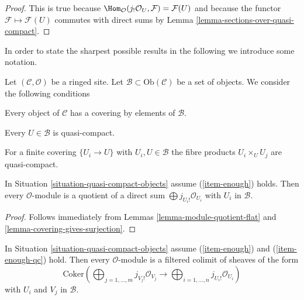 \begin{proof}
This is true because
$\Hom_\mathcal{O}(j_!\mathcal{O}_U, \mathcal{F}) = \mathcal{F}(U)$
and because the functor $\mathcal{F} \mapsto \mathcal{F}(U)$
commutes with direct sums by
Lemma \ref{lemma-sections-over-quasi-compact}.
\end{proof}

\noindent
In order to state the sharpest possible results in the following
we introduce some notation.

\begin{situation}
\label{situation-quasi-compact-objects}
Let $(\mathcal{C}, \mathcal{O})$ be a ringed site. Let
$\mathcal{B} \subset \text{Ob}(\mathcal{C})$ be a set
of objects. We consider the following conditions
\begin{list}{(\thesubsubsection)}{\setlength{}}
\item
\label{item-enough}
Every object of $\mathcal{C}$ has a covering by elements of $\mathcal{B}$.
\item
\label{item-enough-qc}
Every $U \in \mathcal{B}$ is quasi-compact.
\item
\label{item-enough-qc-qs}
For a finite covering $\{U_i \to U\}$ with $U_i, U \in \mathcal{B}$
the fibre products $U_i \times_U U_j$ are quasi-compact.
\end{list}
\end{situation}

\begin{lemma}
\label{lemma-module-quotient-direct-sum}
In Situation \ref{situation-quasi-compact-objects} assume
(\ref{item-enough}) holds. Then every $\mathcal{O}$-module is a quotient
of a direct sum $\bigoplus\nolimits j_{U_i!}\mathcal{O}_{U_i}$
with $U_i$ in $\mathcal{B}$.
\end{lemma}

\begin{proof}
Follows immediately from Lemmas \ref{lemma-module-quotient-flat} and
\ref{lemma-covering-gives-surjection}.
\end{proof}

\begin{lemma}
\label{lemma-module-filtered-colimit-constructibles}
In Situation \ref{situation-quasi-compact-objects} assume
(\ref{item-enough}) and (\ref{item-enough-qc}) hold.
Then every $\mathcal{O}$-module is a filtered colimit of sheaves
of the form
\begin{equation}
\label{equation-towards-constructible}
\text{Coker}\left(
\bigoplus\nolimits_{j = 1, \ldots, m} j_{V_j!}\mathcal{O}_{V_j}
\longrightarrow
\bigoplus\nolimits_{i = 1, \ldots, n} j_{U_i!}\mathcal{O}_{U_i}
\right)
\end{equation}
with $U_i$ and $V_j$ in $\mathcal{B}$.
\end{lemma}

